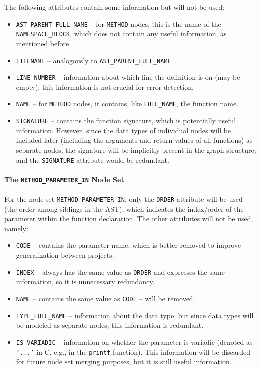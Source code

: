 The following attributes contain some information but will not be used:
\begin{itemize}
    \item \texttt{AST\_PARENT\_FULL\_NAME} -- for \texttt{METHOD} nodes, this is the name of the \texttt{NAMESPACE\_BLOCK}, which does not contain any useful information, as mentioned before.
    \item \texttt{FILENAME} -- analogously to \texttt{AST\_PARENT\_FULL\_NAME}.
    \item \texttt{LINE\_NUMBER} -- information about which line the definition is on (may be empty), this information is not crucial for error detection.
    \item \texttt{NAME} -- for \texttt{METHOD} nodes, it contains, like \texttt{FULL\_NAME}, the function name.
    \item \texttt{SIGNATURE} -- contains the function signature, which is potentially useful information. However, since the data types of individual nodes will be included later (including the arguments and return values of all functions) as separate nodes, the signature will be implicitly present in the graph structure, and the \texttt{SIGNATURE} attribute would be redundant.
\end{itemize}

\paragraph{The \texttt{METHOD\_PARAMETER\_IN} Node Set}
For the node set \texttt{METHOD\_PARAMETER\_IN}, only the \texttt{ORDER} attribute will be used (the order among siblings in the AST), which indicates the index/order of the parameter within the function declaration. The other attributes will not be used, namely:
\begin{itemize}
    \item \texttt{CODE} -- contains the parameter name, which is better removed to improve generalization between projects.
    \item \texttt{INDEX} -- always has the same value as \texttt{ORDER} and expresses the same information, so it is unnecessary redundancy.
    \item \texttt{NAME} -- contains the same value as \texttt{CODE} --  will be removed.
    \item \texttt{TYPE\_FULL\_NAME} -- information about the data type, but since data types will be modeled as separate nodes, this information is redundant.
    \item \texttt{IS\_VARIADIC} -- information on whether the parameter is variadic (denoted as \texttt{'...'} in C, e.g., in the \texttt{printf} function). This information will be discarded for future node set merging purposes, but it is still useful information.
\end{itemize}

